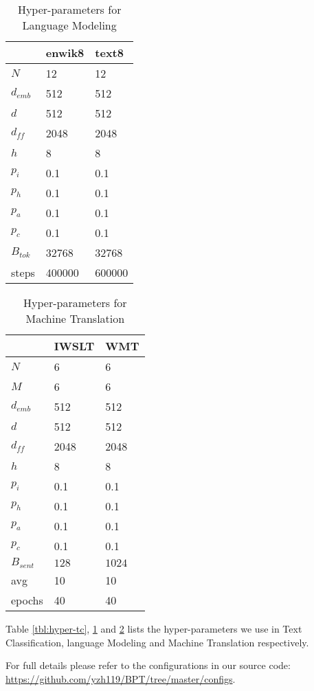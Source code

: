 \documentclass[11pt,a4paper]{article}
\begin{document}
\begin{table}[!htb]
\centering
\begin{tabular}{lll}
\toprule
          & enwik8 & text8 \\
\midrule
$N$       & 12   & 12    \\
$d_{emb}$ & 512 & 512  \\
$d$       & 512 & 512  \\
$d_{ff}$  & 2048 & 2048  \\
$h$       & 8   & 8    \\
$p_i$     & 0.1 & 0.1  \\
$p_h$     & 0.1 & 0.1  \\
$p_a$     & 0.1 & 0.1  \\
$p_c$     & 0.1 & 0.1  \\
$B_{tok}$       & 32768 & 32768 \\
steps     & 400000 & 600000   \\
\bottomrule
\end{tabular}
\caption{Hyper-parameters for Language Modeling}
\label{tbl:hyper-lm}
\end{table}
\begin{table}[!htb]
\centering
\begin{tabular}{lll}
\toprule
          & IWSLT & WMT \\
\midrule
$N$       & 6   & 6    \\
$M$       & 6   & 6    \\
$d_{emb}$ & 512 & 512  \\
$d$       & 512 & 512  \\
$d_{ff}$  & 2048 & 2048  \\
$h$       & 8   & 8    \\
$p_i$     & 0.1 & 0.1  \\
$p_h$     & 0.1 & 0.1  \\
$p_a$     & 0.1 & 0.1  \\
$p_c$     & 0.1 & 0.1  \\
$B_{sent}$       & $128$ & $1024$ \\
avg       & 10 & 10   \\
epochs    & 40 & 40   \\
\bottomrule
\end{tabular}
\caption{Hyper-parameters for Machine Translation}
\label{tbl:hyper-mt}
\end{table}

Table \ref{tbl:hyper-tc}, \ref{tbl:hyper-lm} and \ref{tbl:hyper-mt} lists the hyper-parameters we use in Text Classification, language Modeling and Machine Translation respectively.

For full details please refer to the configurations in our source code: \url{https://github.com/yzh119/BPT/tree/master/configs}.
\end{document}
